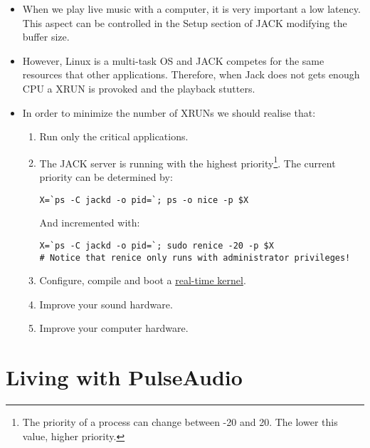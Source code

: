 \begin{itemize}

\item When we play live music with a computer, it is very
  important a low latency. This aspect can be controlled in the Setup
  section of JACK modifying the buffer size.

\item However, Linux is a multi-task OS and JACK competes for the same
  resources that other applications. Therefore, when Jack does not
  gets enough CPU a XRUN is provoked and the playback stutters.

\item In order to minimize the number of XRUNs we should realise that:

  \begin{enumerate}

  \item Run only the critical applications.

  \item The JACK server is running with the highest
    priority\footnote{The priority of a process can change between -20
      and 20. The lower this value, higher priority.}. The current
    priority can be determined by:

\begin{lstlisting}
X=`ps -C jackd -o pid=`; ps -o nice -p $X
\end{lstlisting}

    And incremented with:

\begin{verbatim}
X=`ps -C jackd -o pid=`; sudo renice -20 -p $X
# Notice that renice only runs with administrator privileges!
\end{verbatim}

  \item Configure, compile and boot a
    \href{https://rt.wiki.kernel.org/index.php/Main_Page}{real-time
      kernel}.

  \item Improve your sound hardware.

  \item Improve your computer hardware.

  \end{enumerate}
\end{itemize}

\chapter{Living with PulseAudio}

